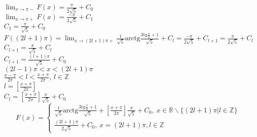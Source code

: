 \documentclass{article}
\begin{document}
$\displaystyle{\lim_{x\to\pi-} F(x)} = \frac{\pi}{2\sqrt{5}}+C_0$\\
$\displaystyle{\lim_{x\to\pi+} F(x)} = \frac{-\pi}{2\sqrt{5}}+C_1$\\
$C_1 = \frac{\pi}{\sqrt{5}} +C_0$\\
$F((2l+1)\pi) = \displaystyle{\lim_{x\to(2l+1)\pi+}}\frac{1}{\sqrt{5}}\text{arctg}\frac{3\text{tg}\frac{x}{2}+1}{\sqrt{5}}+C_l = \frac{-\pi}{2\sqrt{5}} + C_{l+1} = \frac{\pi}{2\sqrt{5}}+C_l$\\
$C_{l+1} = \frac{\pi}{\sqrt{5}} + C_l$\\
$C_{l+1} = \frac{(l+1)\pi}{\sqrt{5}} + C_0$\\
$(2l-1)\pi < x < (2l+1)\pi$\\
$\frac{x-\pi}{2\pi} < l < \frac{x+\pi}{2\pi},\ l \in \mathbb{Z}$\\
$l = [\frac{x+\pi}{2\pi}]$\\
$C_l = [\frac{x+\pi}{2\pi}]\frac{\pi}{\sqrt{5}} + C_0$\\
$$
    F(x) =
    \begin{cases}
        \frac{1}{\sqrt{5}}\text{arctg}\frac{3\text{tg}\frac{x}{2}+1}{\sqrt{5}} + [\frac{x+\pi}{2\pi}]\frac{\pi}{\sqrt{5}} + C_0,\ x \in \mathbb{R}\backslash\{(2l+1)\pi | l \in \mathbb{Z}\} \\
        \frac{(2l+1)\pi}{2\sqrt{5}}+C_0,\ x = (2l+1)\pi, l\in\mathbb{Z}
    \end{cases}
$$
\end{document}

